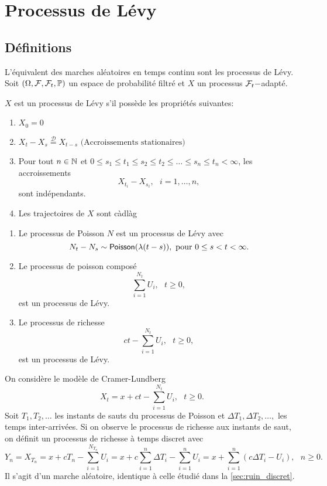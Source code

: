 \section{Processus de Lévy}\label{sec:levy}
\subsection{Définitions}
L'équivalent des marches aléatoires en temps continu sont les processus de Lévy. Soit $(\Omega,\mathcal{F},\mathcal{F}_t,\mathbb{P})$ un espace de probabilité filtré et $X$ un processus $\mathcal{F}_t-$adapté.
\begin{definition}
$X$ est un processus de Lévy s'il possède les propriétés suivantes:
\begin{enumerate}
    \item $X_0 = 0$
    \item $X_t - X_s \overset{\mathcal{D}}{=}X_{t-s}\text{ (Accroissements stationaires)}$
    \item Pour tout $n\in\mathbb{N}$ et $0\leq s_1\leq t_1\leq s_2\leq t_2\leq \ldots\leq s_n\leq t_n<\infty$, les accroissements
    $$
    X_{t_i}-X_{s_i},\text{ }i = 1,\ldots, n,
    $$
    sont indépendants.
    \item Les trajectoires de $X$ sont càdlàg
\end{enumerate}
\end{definition}
\begin{ex}
\begin{enumerate}
    \item Le processus de Poisson $N$ est un processus de Lévy avec 
    $$
    N_t - N_s\sim\mathsf{Poisson}(\lambda(t-s)),\text{ pour }0\leq s<t<\infty.
    $$
    \item Le processus de poisson composé 
    $$
    \sum_{i = 1}^{N_t}U_i, \text{ }t\geq 0,
    $$
    est un processus de Lévy.
    \item Le processus de richesse
    $$
    ct-\sum_{i = 1}^{N_t}U_i,\text{ }t\geq 0,
    $$
    est un processus de Lévy.
\end{enumerate}
\end{ex}
\begin{remark}
On considère le modèle de Cramer-Lundberg 
$$
X_t = x +ct-\sum_{i = 1}^{N_t}U_i,\text{ }t\geq 0.
$$
Soit $T_1,T_2,\ldots$ les instants de sauts du processus de Poisson et $\Delta T_1,\Delta T_2,\ldots, $ les temps inter-arrivées. Si on observe le processus de richesse aux instants de saut, on définit un processus de richesse à temps discret avec 
$$
Y_n = X_{T_n} = x +cT_n -\sum_{i = 1}^{N_{T_n}}U_i = x +c\sum_{i = 1}^{n}\Delta T_i -\sum_{i = 1}^{n}U_i = x +\sum_{i = 1}^{n}(c\Delta T_i -U_i),\text{ }n\geq 0 .
$$
Il s'agit d'un marche aléatoire, identique à celle étudié dans la \cref{sec:ruin_discret}.
\end{remark}
